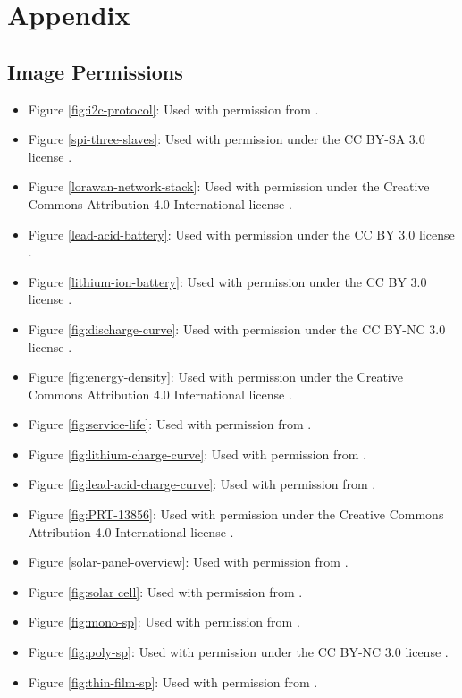 \section{Appendix}
\subsection{Image Permissions}


\begin{itemize}
\item Figure \ref{fig:i2c-protocol}: Used with permission from \cite{i2c-protocol}.

\item Figure \ref{spi-three-slaves}: Used with permission under the CC BY-SA 3.0 license \cite{spi-image}.

\item Figure \ref{lorawan-network-stack}: Used with permission under the Creative Commons Attribution 4.0 International license \cite{lorawan-network-stack}.

\item Figure \ref{lead-acid-battery}: Used with permission under the CC BY 3.0 license \cite{Lead-Acid-Charging}.

\item Figure \ref{lithium-ion-battery}: Used with permission under the CC BY 3.0 license \cite{lithium-batt-ref}.
\item Figure \ref{fig:discharge-curve}: Used with permission under the CC BY-NC 3.0 license \cite{lithium-dis-ref}.
\item Figure \ref{fig:energy-density}: Used with permission under the Creative Commons Attribution 4.0 International license \cite{Energy-den-ref}.
\item Figure \ref{fig:service-life}: Used with permission from \cite{serv-life-ref}.
\item Figure \ref{fig:lithium-charge-curve}: Used with permission from \cite{lith-charge-ref}.
\item Figure \ref{fig:lead-acid-charge-curve}: Used with permission from \cite{lead-charge-ref}.
\item Figure \ref{fig:PRT-13856}: Used with permission under the Creative Commons Attribution 4.0 International license \cite{PRT-ref}.
\item Figure \ref{solar-panel-overview}: Used with permission from \cite{solar-panels-ref}.
\item Figure \ref{fig:solar cell}: Used with permission from \cite{solar-cell-ref}.
\item Figure \ref{fig:mono-sp}: Used with permission from \cite{solar-mono-ref}.
\item Figure \ref{fig:poly-sp}: Used with permission under the CC BY-NC 3.0 license \cite{solar-poly-ref}.
\item Figure \ref{fig:thin-film-sp}: Used with permission from \cite{solar-thin-ref}.
\end{itemize}

